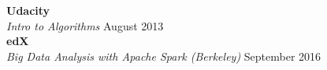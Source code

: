     \textbf{Udacity} \vspace{0mm}\\
				\hspace*{2ex}\textsl{Intro to Algorithms}
						\hfill August 2013 \vspace{0mm}\\
    \textbf{edX} \vspace{0mm}\\
        \hspace*{2ex}\textsl{Big Data Analysis with Apache Spark (Berkeley)}
            \hfill September 2016 \vspace{0mm}